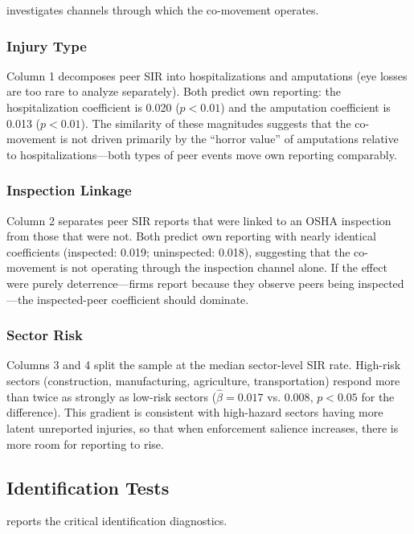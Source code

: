 \documentclass[12pt]{article}
\begin{document}
 investigates channels through which the co-movement operates.

\subsubsection*{Injury Type} Column 1 decomposes peer SIR into hospitalizations and amputations (eye losses are too rare to analyze separately). Both predict own reporting: the hospitalization coefficient is 0.020 ($p < 0.01$) and the amputation coefficient is 0.013 ($p < 0.01$). The similarity of these magnitudes suggests that the co-movement is not driven primarily by the ``horror value'' of amputations relative to hospitalizations---both types of peer events move own reporting comparably.

\subsubsection*{Inspection Linkage} Column 2 separates peer SIR reports that were linked to an OSHA inspection from those that were not. Both predict own reporting with nearly identical coefficients (inspected: 0.019; uninspected: 0.018), suggesting that the co-movement is not operating through the inspection channel alone. If the effect were purely deterrence---firms report because they observe peers being inspected---the inspected-peer coefficient should dominate.

\subsubsection*{Sector Risk} Columns 3 and 4 split the sample at the median sector-level SIR rate. High-risk sectors (construction, manufacturing, agriculture, transportation) respond more than twice as strongly as low-risk sectors ($\hat{\beta} = 0.017$ vs. $0.008$, $p < 0.05$ for the difference). This gradient is consistent with high-hazard sectors having more latent unreported injuries, so that when enforcement salience increases, there is more room for reporting to rise.



\subsection{Identification Tests}

 reports the critical identification diagnostics.
\end{document}
